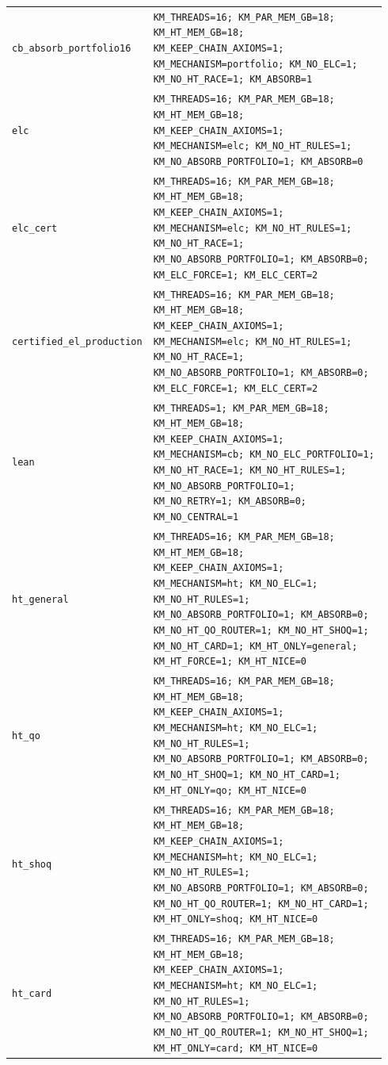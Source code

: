\begin{longtable}{@{}p{0.18\linewidth}p{0.76\linewidth}@{}}
\texttt{cb\_absorb\_portfolio16} & \texttt{KM\_THREADS=16; KM\_PAR\_MEM\_GB=18; KM\_HT\_MEM\_GB=18; KM\_KEEP\_CHAIN\_AXIOMS=1; KM\_MECHANISM=portfolio; KM\_NO\_ELC=1; KM\_NO\_HT\_RACE=1; KM\_ABSORB=1} \\
\texttt{elc} & \texttt{KM\_THREADS=16; KM\_PAR\_MEM\_GB=18; KM\_HT\_MEM\_GB=18; KM\_KEEP\_CHAIN\_AXIOMS=1; KM\_MECHANISM=elc; KM\_NO\_HT\_RULES=1; KM\_NO\_ABSORB\_PORTFOLIO=1; KM\_ABSORB=0} \\
\texttt{elc\_cert} & \texttt{KM\_THREADS=16; KM\_PAR\_MEM\_GB=18; KM\_HT\_MEM\_GB=18; KM\_KEEP\_CHAIN\_AXIOMS=1; KM\_MECHANISM=elc; KM\_NO\_HT\_RULES=1; KM\_NO\_HT\_RACE=1; KM\_NO\_ABSORB\_PORTFOLIO=1; KM\_ABSORB=0; KM\_ELC\_FORCE=1; KM\_ELC\_CERT=2} \\
\texttt{certified\_el\_production} & \texttt{KM\_THREADS=16; KM\_PAR\_MEM\_GB=18; KM\_HT\_MEM\_GB=18; KM\_KEEP\_CHAIN\_AXIOMS=1; KM\_MECHANISM=elc; KM\_NO\_HT\_RULES=1; KM\_NO\_HT\_RACE=1; KM\_NO\_ABSORB\_PORTFOLIO=1; KM\_ABSORB=0; KM\_ELC\_FORCE=1; KM\_ELC\_CERT=2} \\
\texttt{lean} & \texttt{KM\_THREADS=1; KM\_PAR\_MEM\_GB=18; KM\_HT\_MEM\_GB=18; KM\_KEEP\_CHAIN\_AXIOMS=1; KM\_MECHANISM=cb; KM\_NO\_ELC\_PORTFOLIO=1; KM\_NO\_HT\_RACE=1; KM\_NO\_HT\_RULES=1; KM\_NO\_ABSORB\_PORTFOLIO=1; KM\_NO\_RETRY=1; KM\_ABSORB=0; KM\_NO\_CENTRAL=1} \\
\texttt{ht\_general} & \texttt{KM\_THREADS=16; KM\_PAR\_MEM\_GB=18; KM\_HT\_MEM\_GB=18; KM\_KEEP\_CHAIN\_AXIOMS=1; KM\_MECHANISM=ht; KM\_NO\_ELC=1; KM\_NO\_HT\_RULES=1; KM\_NO\_ABSORB\_PORTFOLIO=1; KM\_ABSORB=0; KM\_NO\_HT\_QO\_ROUTER=1; KM\_NO\_HT\_SHOQ=1; KM\_NO\_HT\_CARD=1; KM\_HT\_ONLY=general; KM\_HT\_FORCE=1; KM\_HT\_NICE=0} \\
\texttt{ht\_qo} & \texttt{KM\_THREADS=16; KM\_PAR\_MEM\_GB=18; KM\_HT\_MEM\_GB=18; KM\_KEEP\_CHAIN\_AXIOMS=1; KM\_MECHANISM=ht; KM\_NO\_ELC=1; KM\_NO\_HT\_RULES=1; KM\_NO\_ABSORB\_PORTFOLIO=1; KM\_ABSORB=0; KM\_NO\_HT\_SHOQ=1; KM\_NO\_HT\_CARD=1; KM\_HT\_ONLY=qo; KM\_HT\_NICE=0} \\
\texttt{ht\_shoq} & \texttt{KM\_THREADS=16; KM\_PAR\_MEM\_GB=18; KM\_HT\_MEM\_GB=18; KM\_KEEP\_CHAIN\_AXIOMS=1; KM\_MECHANISM=ht; KM\_NO\_ELC=1; KM\_NO\_HT\_RULES=1; KM\_NO\_ABSORB\_PORTFOLIO=1; KM\_ABSORB=0; KM\_NO\_HT\_QO\_ROUTER=1; KM\_NO\_HT\_CARD=1; KM\_HT\_ONLY=shoq; KM\_HT\_NICE=0} \\
\texttt{ht\_card} & \texttt{KM\_THREADS=16; KM\_PAR\_MEM\_GB=18; KM\_HT\_MEM\_GB=18; KM\_KEEP\_CHAIN\_AXIOMS=1; KM\_MECHANISM=ht; KM\_NO\_ELC=1; KM\_NO\_HT\_RULES=1; KM\_NO\_ABSORB\_PORTFOLIO=1; KM\_ABSORB=0; KM\_NO\_HT\_QO\_ROUTER=1; KM\_NO\_HT\_SHOQ=1; KM\_HT\_ONLY=card; KM\_HT\_NICE=0} \\

\end{longtable}
